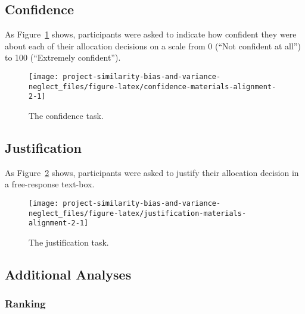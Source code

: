 \documentclass[
  english,
  man, donotrepeattitle,floatsintext]{apa7}
\theoremstyle{definition}
\theoremstyle{definition}
\theoremstyle{definition}
\theoremstyle{definition}
\theoremstyle{remark}
\begin{document}
\hypertarget{confidence-materials-alignment-2}{%
\subsection{Confidence}\label{confidence-materials-alignment-2}}

As Figure~\ref{fig:confidence-materials-alignment-2} shows, participants were
asked to indicate how confident they were about each of their allocation
decisions on a scale from 0 (``Not confident at all'') to 100 (``Extremely
confident'').



\begin{figure}
\texttt{[image: project-similarity-bias-and-variance-neglect\_files/figure-latex/confidence-materials-alignment-2-1]} \caption{The confidence task.}\label{fig:confidence-materials-alignment-2}
\end{figure}

\hypertarget{justification-materials-alignment-2}{%
\subsection{Justification}\label{justification-materials-alignment-2}}

As Figure~\ref{fig:justification-materials-alignment-2} shows, participants
were asked to justify their allocation decision in a free-response text-box.



\begin{figure}
\texttt{[image: project-similarity-bias-and-variance-neglect\_files/figure-latex/justification-materials-alignment-2-1]} \caption{The justification task.}\label{fig:justification-materials-alignment-2}
\end{figure}

\hypertarget{results-alignment-2-appendix}{%
\subsection{Additional Analyses}\label{results-alignment-2-appendix}}

\hypertarget{ranking}{%
\subsubsection{Ranking}\label{ranking}}
\end{document}
